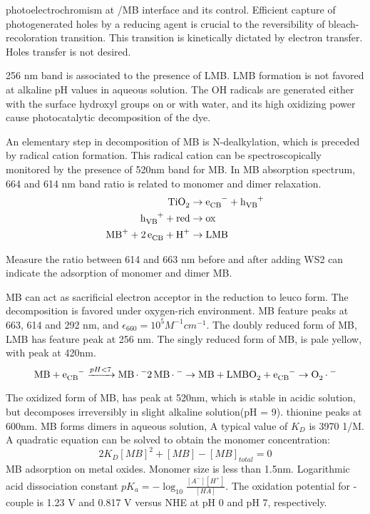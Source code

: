 photoelectrochromism at /MB interface and its control. Efficient capture of photogenerated holes by a reducing agent is crucial to the reversibility of bleach-recoloration transition. This transition is kinetically dictated by electron transfer. Holes transfer is not desired.\cite{DeTacconi1997}

256 nm band is associated to the presence of LMB. LMB formation is not favored at alkaline pH values in aqueous solution. The OH radicals are generated either with the surface hydroxyl groups on  or with water, and its high oxidizing power cause photocatalytic decomposition of the dye.

An elementary step in decomposition of MB is N-dealkylation, which is preceded by radical cation formation.\cite{Takizawa1978} This radical cation can be spectroscopically monitored by the presence of 520nm band for MB. In MB absorption spectrum, 664 and 614 nm band ratio is related to monomer and dimer relaxation.
\begin{align}
\cee{TiO2 &\rightarrow e_{CB}^- + h_{VB}^+ \\
h_{VB}^+ + red &\rightarrow ox\\
MB^+ + 2e_{CB}^ + H^+ &\rightarrow LMB}
\end{align}

Measure the ratio between 614 and 663 nm before and after adding WS2 can indicate the adsorption of monomer and dimer MB.

MB can act as sacrificial electron acceptor in the reduction to leuco form. The decomposition is favored under oxygen-rich environment. MB feature peaks at 663, 614 and 292 nm, and $\epsilon_{660}=10^5 M^{-1}cm^{-1}$. The doubly reduced form of MB, LMB has feature peak at 256 nm. The singly reduced form of MB,  is pale yellow, with peak at 420nm.\cite{Mills1999}
\[
\cee{MB + e_{CB}^- ->[pH<7] MB.^-}
\cee{2MB.^- \rightarrow MB + LMB}
\cee{O2 + e_{CB}^- \rightarrow O2.^-}
\]

The oxidized form of MB,  has peak at 520nm, which is stable in acidic solution, but decomposes irreversibly in slight alkaline solution(pH = 9).
thionine peaks at 600nm.
MB forms dimers in aqueous solution,
A typical value of $K_D$ is 3970 1/M. A quadratic equation can be solved to obtain the monomer concentration:
\[
2K_D [MB]^2 + [MB] - [MB]_{total} = 0
\]
MB adsorption on metal oxides. Monomer size is less than 1.5nm.
Logarithmic acid dissociation constant $pK_a= -\log_10 \frac{[A^-][H^+]}{[HA]}$. The oxidation potential for - couple is 1.23 V and 0.817 V versus NHE at pH 0 and pH 7, respectively.

